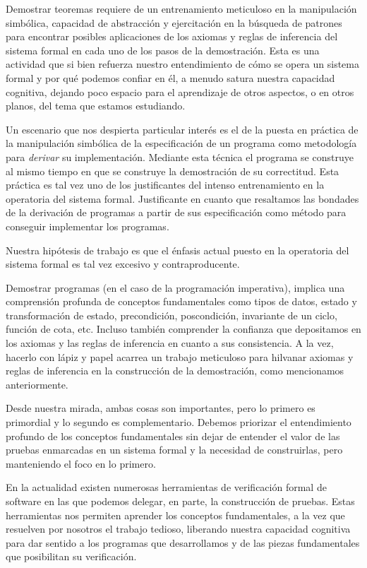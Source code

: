 \documentclass[12pt, a4paper, openany, fleqn]{book}
\begin{document}
    Demostrar teoremas requiere de un entrenamiento meticuloso en la manipulación simbólica, capacidad de abstracción y ejercitación en la búsqueda de patrones para encontrar posibles aplicaciones de los axiomas y reglas de inferencia del sistema formal en cada uno de los pasos de la demostración.
    Esta es una actividad que si bien refuerza nuestro entendimiento de cómo se opera un sistema formal y por qué podemos confiar en él, a menudo satura nuestra capacidad cognitiva, dejando poco espacio para el aprendizaje de otros aspectos, o en otros planos, del tema que estamos estudiando.

    Un escenario que nos despierta particular interés es el de la puesta en práctica de la manipulación simbólica de la especificación de un programa como metodología para \textit{derivar} su implementación. Mediante esta técnica el programa se construye al mismo tiempo en que se construye la demostración de su correctitud.
    Esta práctica es tal vez uno de los justificantes del intenso entrenamiento en la operatoria del sistema formal. Justificante en cuanto que resaltamos las bondades de la derivación de programas a partir de sus especificación como método para conseguir implementar los programas.

    Nuestra hipótesis de trabajo es que el énfasis actual puesto en la operatoria del sistema formal es tal vez excesivo y contraproducente.

    Demostrar programas (en el caso de la programación imperativa), implica una comprensión profunda de conceptos fundamentales como tipos de datos, estado y transformación de estado, precondición, poscondición, invariante de un ciclo, función de cota, etc. Incluso también comprender la confianza que depositamos en los axiomas y las reglas de inferencia en cuanto a sus consistencia.
    A la vez, hacerlo con lápiz y papel acarrea un trabajo meticuloso para hilvanar axiomas y reglas de inferencia en la construcción de la demostración, como mencionamos anteriormente.

    Desde nuestra mirada, ambas cosas son importantes, pero lo primero es primordial y lo segundo es complementario. Debemos priorizar el entendimiento profundo de los conceptos fundamentales sin dejar de entender el valor de las pruebas enmarcadas en un sistema formal y la necesidad de construirlas, pero manteniendo el foco en lo primero.

    En la actualidad existen numerosas herramientas de verificación formal de software en las que podemos delegar, en parte, la construcción de pruebas. Estas herramientas nos permiten aprender los conceptos fundamentales, a la vez que resuelven por nosotros el trabajo tedioso, liberando nuestra capacidad cognitiva para dar sentido a los programas que desarrollamos y de las piezas fundamentales que posibilitan su verificación.
\end{document}
